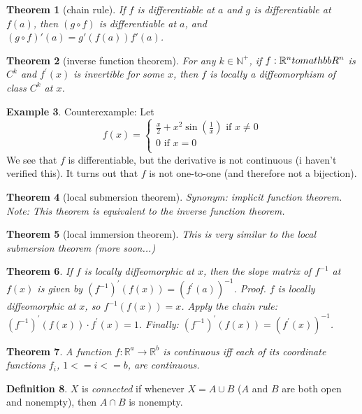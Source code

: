 \documentclass[11pt,leqno,oneside]{amsart}
\newcommand{\R}{{\mathbb R}} %
\newtheorem{thm}{Theorem}[section]
\theoremstyle{definition}
\newtheorem{defn}[thm]{Definition}
\newtheorem{example}[thm]{Example}
\numberwithin{equation}{section}
\begin{document}
\begin{thm}[chain rule]
	If $f$ is differentiable at $a$ and $g$ is differentiable at $f(a)$, then $(g \circ f)$ is differentiable at $a$, and $(g \circ f)'(a) = g'(f(a))f'(a)$.
\end{thm}
\begin{thm}[inverse function theorem]
	For any $k \in \mathbb{N}^+$, if $f:\mathbb{R}^n \\to \\mathbb{R}^n$ is $C^k$ and $f^\prime(x)$ is invertible for some $x$, then $f$ is locally a diffeomorphism of class $C^k$ at $x$.
\end{thm}
\begin{example}
	Counterexample: Let $$f(x) =
	\begin{cases}
		\frac x2 + x^2\sin\left(\frac 1x\right) \text{ if $x \neq 0$} \\
		0 \text{ if $x=0$} \\
	\end{cases}
	$$  We see that $f$ is differentiable, but the derivative is not continuous (i haven't verified this).  It turns out that $f$ is not one-to-one (and therefore not a bijection).
\end{example}
\begin{thm}[local submersion theorem]
	Synonym: implicit function theorem.
	Note: This theorem is equivalent to the inverse function theorem.
\end{thm}
\begin{thm}[local immersion theorem]
	This is very similar to the local submersion theorem (more soon...)
\end{thm}
\begin{thm}
	If $f$ is locally diffeomorphic at $x$, then the slope matrix of $f^{-1}$ at $f(x)$ is given by $(f^{-1})^\prime(f(x)) = (f^\prime(a))^{-1}$.
	Proof. $f$ is locally diffeomorphic at $x$, so $f^{-1}(f(x)) = x$.
	Apply the chain rule: $(f^{-1})^\prime(f(x)) \cdot f^\prime(x) = 1$.
	Finally: $(f^{-1})^\prime(f(x)) = (f^\prime(x))^{-1}$.
\end{thm}
\begin{thm}
	A function $f : \R^a \to \R^b$ is continuous iff each of its coordinate functions $f_i$, $1<= i <=b$, are continuous.
\end{thm}

\begin{defn}
	$X$ is \emph{connected} if whenever $X = A \cup B$ ($A$ and $B$ are both open and nonempty), then $A \cap B$ is nonempty.
\end{defn}
\end{document}
